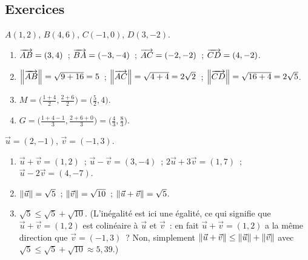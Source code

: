 
\subsection*{Exercices}


$A(1,2)$, $B(4,6)$, $C(-1,0)$, $D(3,-2)$.
\begin{enumerate}
  \item $\overrightarrow{AB}=(3,4)$~; $\overrightarrow{BA}=(-3,-4)$~; $\overrightarrow{AC}=(-2,-2)$~; $\overrightarrow{CD}=(4,-2)$.
  \item $\left\|\overrightarrow{AB}\right\|=\sqrt{9+16}=5$~; $\left\|\overrightarrow{AC}\right\|=\sqrt{4+4}=2\sqrt{2}$~;
        $\left\|\overrightarrow{CD}\right\|=\sqrt{16+4}=2\sqrt{5}$.
  \item $M=\bigl(\tfrac{1+4}{2},\tfrac{2+6}{2}\bigr)=\bigl(\tfrac{5}{2},4\bigr)$.
  \item $G=\bigl(\tfrac{1+4-1}{3},\tfrac{2+6+0}{3}\bigr)=\bigl(\tfrac{4}{3},\tfrac{8}{3}\bigr)$.
\end{enumerate}


$\vec{u}=(2,-1)$, $\vec{v}=(-1,3)$.
\begin{enumerate}
  \item $\vec{u}+\vec{v}=(1,2)$~; $\vec{u}-\vec{v}=(3,-4)$~;
        $2\vec{u}+3\vec{v}=(1,7)$~; $\vec{u}-2\vec{v}=(4,-7)$.
  \item $\left\|\vec{u}\right\|=\sqrt{5}$~; $\left\|\vec{v}\right\|=\sqrt{10}$~;
        $\left\|\vec{u}+\vec{v}\right\|=\sqrt{5}$.
  \item $\sqrt{5}\leq\sqrt{5}+\sqrt{10}$.\checkmark\quad
        (L'in\'egalit\'e est ici une \'egalit\'e, ce qui signifie que
        $\vec{u}+\vec{v}=(1,2)$ est colin\'eaire \`a $\vec{u}$ et $\vec{v}$~:
        en fait $\vec{u}+\vec{v}=(1,2)$ a la m\^eme direction que $\vec{v}=(-1,3)$~?
        Non, simplement $\left\|\vec{u}+\vec{v}\right\|\leq\left\|\vec{u}\right\|+\left\|\vec{v}\right\|$
        avec $\sqrt{5}\leq\sqrt{5}+\sqrt{10}\approx5{,}39$.\checkmark)
\end{enumerate}


